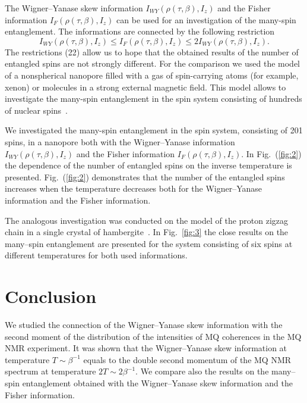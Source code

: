 \documentclass[preprint,12pt]{elsarticle}
\begin{document}
The Wigner--Yanase skew information $I_{WY}(\rho(\tau,\beta),I_z)$ and the Fisher information $I_F(\rho(\tau,\beta),I_z)$ can be used for an investigation of the many-spin entanglement.
The informations are connected by the following restriction~\cite{3}
%
\begin{equation} \label{eq:22}
    I_{WY}\left(\rho(\tau,\beta), I_z\right)
    \leq I_F\left(\rho(\tau,\beta), I_z\right)
    \leq 2I_{WY}\left(\rho(\tau,\beta), I_z\right).
\end{equation}
%
The restrictions (22) allow us to hope that the obtained results of the number of entangled spins are not strongly different.
For the comparison we used the model~\cite{23} of a nonspherical nanopore filled with a gas of spin-carrying atoms (for example, xenon) or molecules in a strong external magnetic field.
This model allows to investigate the many-spin entanglement in the spin system consisting of hundreds of nuclear spins~\cite{8}.


We investigated the many-spin entanglement in the spin system, consisting of 201 spins, in a nanopore both with
the Wigner--Yanase information $I_{WY}\left(\rho(\tau, \beta), I_z\right)$
and the Fisher information $I_F\left(\rho(\tau,\beta),I_z\right)$.
In Fig.~(\ref{fig:2}) the dependence of the number of entangled spins on the inverse temperature is presented.
Fig.~(\ref{fig:2}) demonstrates that the number of the entangled spins increases when the temperature decreases both for the Wigner--Yanase information and the Fisher information.


The analogous investigation was conducted on the model of the proton zigzag chain in a single crystal of hambergite~\cite{16,24}.
In Fig.~\ref{fig:3} the close results on the many--spin entanglement are presented for the system consisting of six spins at different temperatures for both used informations.


\section{Conclusion}
\label{sec:5}

We studied the connection of the Wigner--Yanase skew information with the second moment of the distribution of the intensities of MQ coherences in the MQ NMR experiment.
It was shown that the Wigner--Yanase skew information at temperature $T \sim \beta^{-1}$ equals to the double second momentum of the MQ NMR spectrum at temperature $2T \sim 2\beta^{-1}$.
We compare also the results on the many--spin entanglement obtained with the Wigner--Yanase skew information and the Fisher information.
\end{document}

